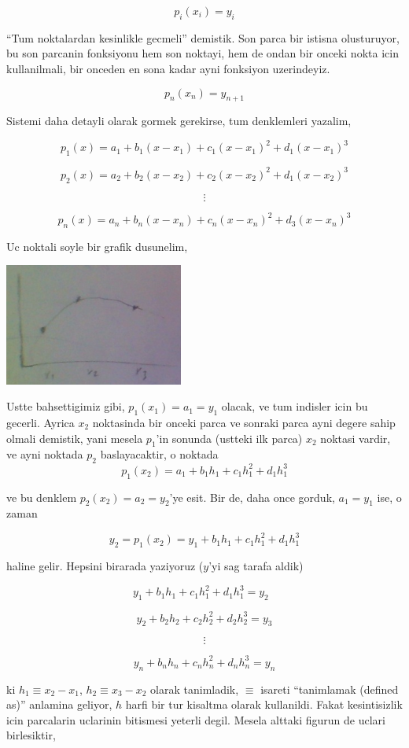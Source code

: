 \documentclass[12pt,fleqn]{article}\usepackage{../common}
\begin{document}
$$ p_i(x_i) = y_i $$

``Tum noktalardan kesinlikle gecmeli'' demistik. Son parca bir istisna
olusturuyor, bu son parcanin fonksiyonu hem son noktayi, hem de ondan bir
onceki nokta icin kullanilmali, bir onceden en sona kadar ayni fonksiyon
uzerindeyiz. 

$$ p_{n}(x_n) = y_{n+1} $$

Sistemi daha detayli olarak gormek gerekirse, tum denklemleri yazalim,

$$ p_1(x)  = a_1 + b_1(x-x_1) + c_1(x-x_1)^2 + d_1(x-x_1)^3$$

$$ p_2(x)  = a_2 + b_2(x-x_2) + c_2(x-x_2)^2 + d_1(x-x_2)^3$$

$$ \vdots $$

$$ p_n(x)  = a_n + b_n(x-x_n) + c_n(x-x_n)^2 + d_3(x-x_n)^3$$

Uc noktali soyle bir grafik dusunelim,

\includegraphics[height=4cm]{spline2.png}

Ustte bahsettigimiz gibi, $p_1(x_1) = a_1 = y_1$ olacak, ve tum indisler
icin bu gecerli. Ayrica $x_2$ noktasinda bir onceki parca ve sonraki parca
ayni degere sahip olmali demistik, yani mesela $p_1$'in sonunda (ustteki
ilk parca) $x_2$ noktasi vardir, ve ayni noktada $p_2$ baslayacaktir, o
noktada 
$$ p_1(x_2) = a_1 + b_1h_1 + c_1h_1^2 + d_1h_1^3  $$

ve bu denklem $p_2(x_2) = a_2 = y_2$'ye esit. Bir de, daha once gorduk, $a_1 =
y_1$ 
ise, o zaman 

$$ y_2 = p_1(x_2) = y_1 + b_1h_1 + c_1h_1^2 + d_1h_1^3 $$

haline gelir. Hepsini birarada yaziyoruz ($y$'yi sag tarafa aldik)

$$ y_1 + b_1h_1 + c_1h_1^2 + d_1h_1^3 = y_2 \ \ \ \label{2} $$

$$ y_2 + b_2h_2 + c_2h_2^2 + d_2h_2^3 = y_3 $$

$$ \vdots $$

$$ y_n + b_nh_n + c_nh_n^2 + d_nh_n^3 = y_n $$

ki $h_1 \equiv x_2 - x_1$, $h_2 \equiv x_3 - x_2$ olarak tanimladik,
$\equiv$ isareti ``tanimlamak (defined as)'' anlamina geliyor, $h$
harfi bir tur kisaltma olarak kullanildi. Fakat kesintisizlik icin
parcalarin uclarinin bitismesi yeterli degil. Mesela alttaki figurun de
uclari birlesiktir,
\end{document}
